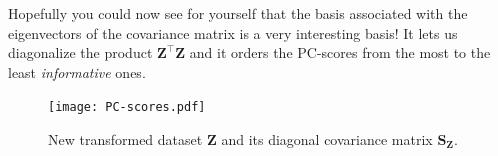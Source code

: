 \documentclass[10pt,twocolumn]{article}
\begin{document}
Hopefully you could now see for yourself that the basis associated with the eigenvectors of the covariance matrix is a very interesting basis! It lets us diagonalize the product $\mathbf{Z}^{\top} \mathbf{Z}$ and it orders the PC-scores from the most to the least \textit{informative} ones.
\begin{figure}[t]
\centering\texttt{[image: PC-scores.pdf]}
\caption{New transformed dataset $\mathbf{Z}$ and its diagonal covariance matrix $\mathbf{S_Z}$.}
\label{fig:PC-scores}
\end{figure}

%
%
\end{document}
